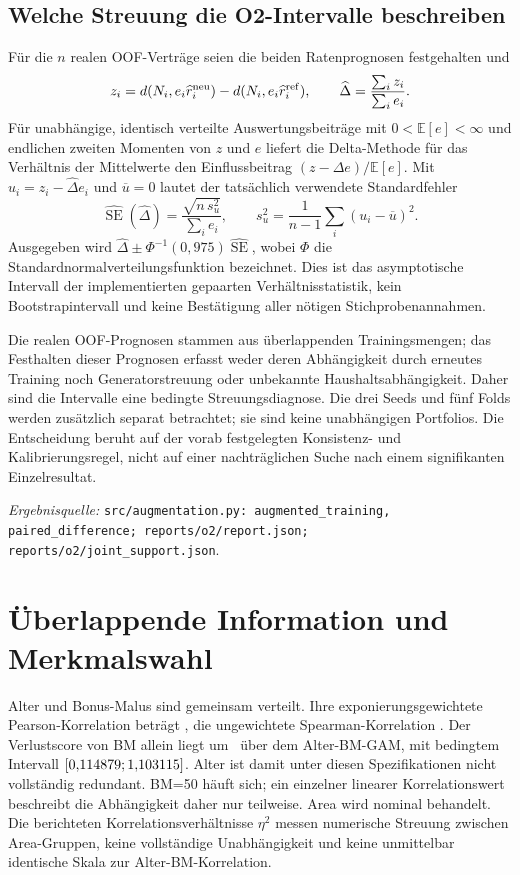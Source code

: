 \documentclass[11pt,a4paper]{article}
\newcommand{\E}{\mathbb E}
\newcommand{\evidence}[1]{\par{\footnotesize\textit{Ergebnisquelle:} \nolinkurl{#1}.}\par}
\begin{document}
\subsection*{Welche Streuung die O2-Intervalle beschreiben}
Für die $n$ realen OOF-Verträge seien die beiden Ratenprognosen festgehalten und
\begin{equation}
 z_i=d(N_i,e_i\widehat r_i^{\rm neu})-d(N_i,e_i\widehat r_i^{\rm ref}),
 \qquad \widehat\Delta=\frac{\sum_i z_i}{\sum_i e_i}.
\end{equation}
Für unabhängige, identisch verteilte Auswertungsbeiträge mit $0<\E[e]<\infty$ und endlichen zweiten Momenten von $z$ und $e$ liefert die Delta-Methode für das Verhältnis der Mittelwerte den Einflussbeitrag $(z-\Delta e)/\E[e]$. Mit $u_i=z_i-\widehat\Delta e_i$ und $\overline u=0$ lautet der tatsächlich verwendete Standardfehler
\begin{equation}
 \widehat{\operatorname{SE}}(\widehat\Delta)
 =\frac{\sqrt{n\,s_u^2}}{\sum_i e_i},\qquad
 s_u^2=\frac1{n-1}\sum_i(u_i-\overline u)^2.
\end{equation}
Ausgegeben wird $\widehat\Delta\pm\Phi^{-1}(0{,}975)\widehat{\operatorname{SE}}$, wobei $\Phi$ die Standardnormalverteilungsfunktion bezeichnet. Dies ist das asymptotische Intervall der implementierten gepaarten Verhältnisstatistik, kein Bootstrapintervall und keine Bestätigung aller nötigen Stichprobenannahmen.

Die realen OOF-Prognosen stammen aus überlappenden Trainingsmengen; das Festhalten dieser Prognosen erfasst weder deren Abhängigkeit durch erneutes Training noch Generatorstreuung oder unbekannte Haushaltsabhängigkeit. Daher sind die Intervalle eine bedingte Streuungsdiagnose. Die drei Seeds und fünf Folds werden zusätzlich separat betrachtet; sie sind keine unabhängigen Portfolios. Die Entscheidung beruht auf der vorab festgelegten Konsistenz- und Kalibrierungsregel, nicht auf einer nachträglichen Suche nach einem signifikanten Einzelresultat.
\evidence{src/augmentation.py: augmented_training, paired_difference; reports/o2/report.json; reports/o2/joint_support.json}

\clearpage
\section{Überlappende Information und Merkmalswahl}\label{app:ablation}
Alter und Bonus-Malus sind gemeinsam verteilt. Ihre exponierungsgewichtete Pearson-Korrelation beträgt \AgeBMRho, die ungewichtete Spearman-Korrelation \AgeBMRank. Der Verlustscore von BM allein liegt um \BMOnlyDifference\ über dem Alter-BM-GAM, mit bedingtem Intervall $[0{,}114879;1{,}103115]$. Alter ist damit unter diesen Spezifikationen nicht vollständig redundant. BM=50 häuft sich; ein einzelner linearer Korrelationswert beschreibt die Abhängigkeit daher nur teilweise. Area wird nominal behandelt. Die berichteten Korrelationsverhältnisse $\eta^2$ messen numerische Streuung zwischen Area-Gruppen, keine vollständige Unabhängigkeit und keine unmittelbar identische Skala zur Alter-BM-Korrelation.
\end{document}
